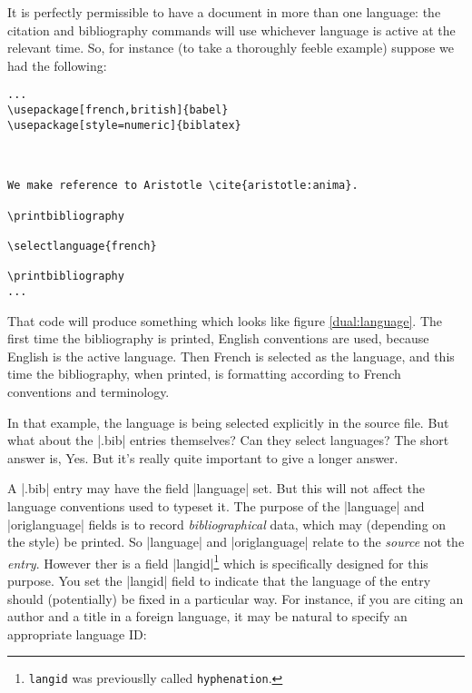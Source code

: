 It is perfectly permissible to have a document in more than one language: the citation and bibliography commands will use whichever language is active at the relevant time. So, for instance (to take a thoroughly feeble example) suppose we had the following:

\begin{Verbatim}[frame=single]
...
\usepackage[french,british]{babel}
\usepackage[style=numeric]{biblatex}



We make reference to Aristotle \cite{aristotle:anima}.

\printbibliography

\selectlanguage{french}

\printbibliography
...
\end{Verbatim}

\begin{figure*}
\vspace{3pt}%
\caption{A document using two languages\label{dual:language}}
\end{figure*}

That code will produce something which looks like figure \ref{dual:language}. The first time the bibliography is printed, English conventions are used, because English is the active language. Then French is selected as the language, and this time the bibliography, when printed, is formatting according to French conventions and terminology.

In that example, the language is being selected explicitly in the source file. But what about the |.bib| entries themselves? Can they select languages? The short answer is, Yes. But it's really quite important to give a longer answer.

A |.bib| entry may have the field |language| set. But this will not affect the language conventions used to typeset it. The purpose of the |language| and |origlanguage| fields is to record \emph{bibliographical} data, which may (depending on the style) be printed. So |language| and |origlanguage| relate to the \emph{source} not the \emph{entry}. However ther is a field |langid|\footnote{\texttt{langid} was previouslly called \texttt{hyphenation}.} which is specifically designed for this purpose. You set the |langid| field to indicate that the language of the entry should (potentially) be fixed in a particular way. For instance, if you are citing an author and a title in a foreign language, it may be natural to specify an appropriate language ID:

